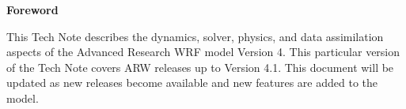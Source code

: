 \begin{titlepage}
\newpage
\vspace*{2cm}
\vskip 24pt
\begin{center}
\large \textbf{Foreword}
\end{center}
\vspace{1cm}
This Tech Note describes the dynamics, solver, physics, and data assimilation aspects of the Advanced
Research WRF model Version 4. This particular version of the Tech Note covers ARW releases up to Version 4.1.
This document will be updated as new releases become available and new features are added to the model.

\vfill
\pagebreak
\hphantom{This page is left blank}

\rmfamily
\end{titlepage}
\setcounter{page}{1}
